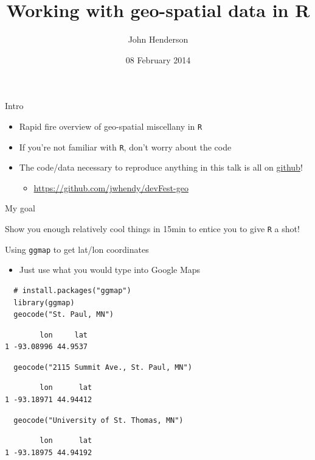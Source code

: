 \documentclass[sans,aspectratio=169,presentation,bigger,fleqn]{beamer}
\author{John Henderson}
\date{08 February 2014}
\title{Working with geo-spatial data in R}
\begin{document}
\maketitle


\begin{frame}[fragile,label=sec-1]{Intro}
 \begin{itemize}
\item Rapid fire overview of geo-spatial miscellany in \texttt{R}
\item If you're not familiar with \texttt{R}, don't worry about the code
\item The code/data necessary to reproduce anything in this talk is all on \href{https://github.com/jwhendy/devFest-geo}{github}!
\begin{itemize}
\item \url{https://github.com/jwhendy/devFest-geo}
\end{itemize}
\end{itemize}

\vspace{1cm} \pause

\alert{My goal}

Show you enough relatively cool things in 15min to entice you to give \texttt{R} a shot!
\end{frame}
\begin{frame}[fragile,label=sec-2]{Using \texttt{ggmap} to get lat/lon coordinates}
 \begin{itemize}
\item Just use what you would type into Google Maps
\end{itemize}


\scriptsize

\begin{verbatim}
  # install.packages("ggmap")
  library(ggmap)
  geocode("St. Paul, MN")
\end{verbatim}
\begin{verbatim}
        lon     lat
1 -93.08996 44.9537
\end{verbatim}

\begin{verbatim}
  geocode("2115 Summit Ave., St. Paul, MN")
\end{verbatim}
\begin{verbatim}
        lon      lat
1 -93.18971 44.94412
\end{verbatim}

\begin{verbatim}
  geocode("University of St. Thomas, MN")
\end{verbatim}
\begin{verbatim}
        lon      lat
1 -93.18975 44.94192
\end{verbatim}

\normalsize
\end{frame}
\end{document}
